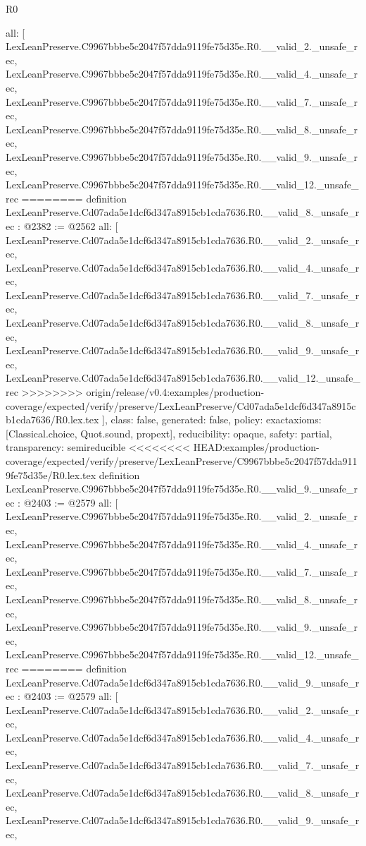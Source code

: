 \begin{lexlean}{R0}
\begin{coremodule}
{{{{{{{{{{{{{{{{{{{{{{{{{{{{{{{{{{{{{{{{{{{{{{{{{{{{{  all: [
    LexLeanPreserve.C9967bbbe5c2047f57dda9119fe75d35e.R0.__valid_2._unsafe_rec,
    LexLeanPreserve.C9967bbbe5c2047f57dda9119fe75d35e.R0.__valid_4._unsafe_rec,
    LexLeanPreserve.C9967bbbe5c2047f57dda9119fe75d35e.R0.__valid_7._unsafe_rec,
    LexLeanPreserve.C9967bbbe5c2047f57dda9119fe75d35e.R0.__valid_8._unsafe_rec,
    LexLeanPreserve.C9967bbbe5c2047f57dda9119fe75d35e.R0.__valid_9._unsafe_rec,
    LexLeanPreserve.C9967bbbe5c2047f57dda9119fe75d35e.R0.__valid_12._unsafe_rec
========
definition LexLeanPreserve.Cd07ada5e1dcf6d347a8915cb1cda7636.R0.__valid_8._unsafe_rec : @2382 := @2562 {
  all: [
    LexLeanPreserve.Cd07ada5e1dcf6d347a8915cb1cda7636.R0.__valid_2._unsafe_rec,
    LexLeanPreserve.Cd07ada5e1dcf6d347a8915cb1cda7636.R0.__valid_4._unsafe_rec,
    LexLeanPreserve.Cd07ada5e1dcf6d347a8915cb1cda7636.R0.__valid_7._unsafe_rec,
    LexLeanPreserve.Cd07ada5e1dcf6d347a8915cb1cda7636.R0.__valid_8._unsafe_rec,
    LexLeanPreserve.Cd07ada5e1dcf6d347a8915cb1cda7636.R0.__valid_9._unsafe_rec,
    LexLeanPreserve.Cd07ada5e1dcf6d347a8915cb1cda7636.R0.__valid_12._unsafe_rec
>>>>>>>> origin/release/v0.4:examples/production-coverage/expected/verify/preserve/LexLeanPreserve/Cd07ada5e1dcf6d347a8915cb1cda7636/R0.lex.tex
  ],
  class: false,
  generated: false,
  policy: exact{axioms: [Classical.choice, Quot.sound, propext]},
  reducibility: opaque{},
  safety: partial,
  transparency: semireducible
}
<<<<<<<< HEAD:examples/production-coverage/expected/verify/preserve/LexLeanPreserve/C9967bbbe5c2047f57dda9119fe75d35e/R0.lex.tex
definition LexLeanPreserve.C9967bbbe5c2047f57dda9119fe75d35e.R0.__valid_9._unsafe_rec : @2403 := @2579 {
  all: [
    LexLeanPreserve.C9967bbbe5c2047f57dda9119fe75d35e.R0.__valid_2._unsafe_rec,
    LexLeanPreserve.C9967bbbe5c2047f57dda9119fe75d35e.R0.__valid_4._unsafe_rec,
    LexLeanPreserve.C9967bbbe5c2047f57dda9119fe75d35e.R0.__valid_7._unsafe_rec,
    LexLeanPreserve.C9967bbbe5c2047f57dda9119fe75d35e.R0.__valid_8._unsafe_rec,
    LexLeanPreserve.C9967bbbe5c2047f57dda9119fe75d35e.R0.__valid_9._unsafe_rec,
    LexLeanPreserve.C9967bbbe5c2047f57dda9119fe75d35e.R0.__valid_12._unsafe_rec
========
definition LexLeanPreserve.Cd07ada5e1dcf6d347a8915cb1cda7636.R0.__valid_9._unsafe_rec : @2403 := @2579 {
  all: [
    LexLeanPreserve.Cd07ada5e1dcf6d347a8915cb1cda7636.R0.__valid_2._unsafe_rec,
    LexLeanPreserve.Cd07ada5e1dcf6d347a8915cb1cda7636.R0.__valid_4._unsafe_rec,
    LexLeanPreserve.Cd07ada5e1dcf6d347a8915cb1cda7636.R0.__valid_7._unsafe_rec,
    LexLeanPreserve.Cd07ada5e1dcf6d347a8915cb1cda7636.R0.__valid_8._unsafe_rec,
    LexLeanPreserve.Cd07ada5e1dcf6d347a8915cb1cda7636.R0.__valid_9._unsafe_rec,
}}}}}}}}}}}}}}}}}}}}}}}}}}}}}}}}}}}}}}}}}}}}}}}}}}}}}}}
\end{coremodule}
\end{lexlean}
